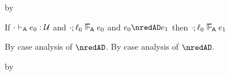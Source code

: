 {\begin{lamportproof*}
    \begin{pfproof}
      by 
    \end{pfproof}

\end{lamportproof*}}

\begin{lemma}\label{A-D-label-preservation}
  If\/ ${\cdot} \vdash_{\mathsf{A}} e_0 : {\mathcal U}$
  and\/ $\snil; \sowner_0 \sWLA \sexpr_0$
  and\/ $\sexpr_0 \nredAD \sexpr_1$
  then\/ $\snil; \sowner_0 \sWLA \sexpr_1$
\end{lemma}{
  \newcommand{\shortpf}{By case analysis of $\nredAD$.}
\begin{lamportproof*}
  \shortpf
  \mainproof
  \shortpf

    \begin{pfproof}
      \qedstep
    \end{pfproof}

    \begin{pfproof}
      \qedstep
        \begin{pfproof}
          by 
        \end{pfproof}
    \end{pfproof}


\end{lamportproof*}}
